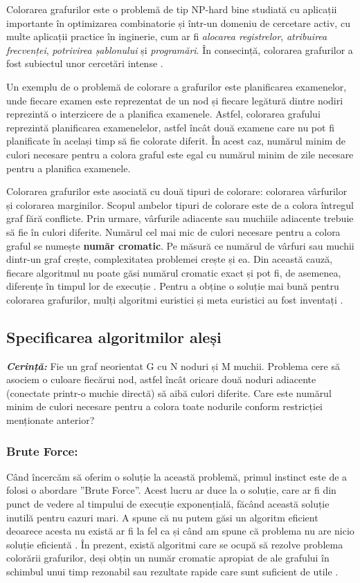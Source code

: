 \documentclass[runningheads]{paper}
\begin{document}
Colorarea grafurilor este o problemă de tip NP-hard bine studiată cu aplicații 
importante în optimizarea combinatorie și într-un domeniu de cercetare activ, cu 
multe aplicații practice \cite{4} în inginerie, cum ar fi \textit{alocarea registrelor}, 
\textit{atribuirea frecvenței}, \textit{potrivirea șablonului} și \textit{programări}. 
În consecință, colorarea grafurilor a fost subiectul unor cercetări intense \cite{5} \cite{2}.

Un exemplu de o problemă de colorare a grafurilor este planificarea examenelor, unde
fiecare examen este reprezentat de un nod și fiecare legătură dintre nodiri reprezintă
o interzicere de a planifica examenele. Astfel, colorarea grafului reprezintă planificarea
examenelelor, astfel încât două examene care nu pot fi planificate în același timp să fie
colorate diferit. În acest caz, numărul minim de culori necesare pentru a colora graful
este egal cu numărul minim de zile necesare pentru a planifica examenele. \cite{6}

Colorarea grafurilor este asociată cu două tipuri de colorare: colorarea vârfurilor 
și colorarea marginilor. Scopul ambelor tipuri de colorare este de a colora întregul graf fără
conflicte. Prin urmare, vârfurile adiacente sau muchiile adiacente trebuie
să fie în culori diferite. Numărul cel mai mic de culori necesare 
pentru a colora graful se numește \textbf{număr cromatic}.
Pe măsură ce numărul de vârfuri sau muchii dintr-un graf crește,
complexitatea problemei crește și ea. Din această cauză, fiecare
algoritmul nu poate găsi numărul cromatic exact  
și pot fi, de asemenea, diferențe în timpul lor de execuție \cite{7}. Pentru a obține 
o soluție mai bună pentru colorarea grafurilor, mulți algoritmi euristici și meta
euristici au fost inventați \cite{8}.
% 
\subsection{Specificarea algoritmilor aleși}

\textbf{\textit{Cerință:}} Fie un graf neorientat G cu N noduri și M muchii. Problema cere să asociem o culoare 
fiecărui nod, astfel încât oricare două noduri adiacente (conectate printr-o muchie directă) 
să aibă culori diferite. Care este numărul minim de culori necesare pentru a colora 
toate nodurile conform restricției menționate anterior? \cite{9}

\subsubsection{Brute Force:}
Când încercăm să oferim o soluție la această problemă, primul instinct este de a
folosi o abordare ”Brute Force”. Acest lucru ar duce la o soluție, care ar fi 
din punct de vedere al timpului de execuție exponențială, făcând această soluție 
inutilă pentru cazuri mari. A spune că nu putem găsi un algoritm eficient 
deoarece acesta nu există ar fi la fel ca și când am spune că problema nu are 
nicio soluție eficientă \cite{10}.
În prezent, există algoritmi care se ocupă să rezolve problema colorării grafurilor, 
deși obțin un număr cromatic apropiat de ale grafului în schimbul unui timp
rezonabil sau rezultate rapide care sunt suficient de utile \cite{11}.
\end{document}
